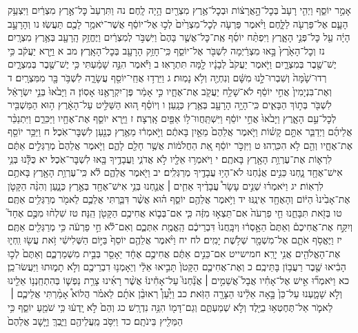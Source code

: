 \documentclass[twoside, openany, parskip=half, 11pt]{book}
\begin{document}
אָמַ֣ר יוֹסֵ֑ף וַיְהִ֤י רָעָב֙ בְּכׇל־הָ֣אֲרָצ֔וֹת וּבְכׇל־אֶ֥רֶץ מִצְרַ֖יִם הָ֥יָה לָֽחֶם׃ נה וַתִּרְעַב֙ כׇּל־אֶ֣רֶץ מִצְרַ֔יִם וַיִּצְעַ֥ק הָעָ֛ם אֶל־פַּרְעֹ֖ה לַלָּ֑חֶם וַיֹּ֨אמֶר פַּרְעֹ֤ה לְכׇל־מִצְרַ֙יִם֙ לְכ֣וּ אֶל־יוֹסֵ֔ף אֲשֶׁר־יֹאמַ֥ר לָכֶ֖ם תַּעֲשֽׂוּ׃ נו וְהָרָעָ֣ב הָיָ֔ה עַ֖ל כׇּל־פְּנֵ֣י הָאָ֑רֶץ וַיִּפְתַּ֨ח יוֹסֵ֜ף אֶֽת־כׇּל־אֲשֶׁ֤ר בָּהֶם֙ וַיִּשְׁבֹּ֣ר לְמִצְרַ֔יִם וַיֶּחֱזַ֥ק הָֽרָעָ֖ב בְּאֶ֥רֶץ מִצְרָֽיִם׃ נז וְכׇל־הָאָ֙רֶץ֙ בָּ֣אוּ מִצְרַ֔יְמָה לִשְׁבֹּ֖ר אֶל־יוֹסֵ֑ף כִּֽי־חָזַ֥ק הָרָעָ֖ב בְּכׇל־הָאָֽרֶץ׃ מב א וַיַּ֣רְא יַעֲקֹ֔ב כִּ֥י יֶשׁ־שֶׁ֖בֶר בְּמִצְרָ֑יִם וַיֹּ֤אמֶר יַעֲקֹב֙ לְבָנָ֔יו לָ֖מָּה תִּתְרָאֽוּ׃ ב וַיֹּ֕אמֶר הִנֵּ֣ה שָׁמַ֔עְתִּי כִּ֥י יֶשׁ־שֶׁ֖בֶר בְּמִצְרָ֑יִם רְדוּ־שָׁ֙מָּה֙ וְשִׁבְרוּ־לָ֣נוּ מִשָּׁ֔ם וְנִחְיֶ֖ה וְלֹ֥א נָמֽוּת׃ ג וַיֵּרְד֥וּ אֲחֵֽי־יוֹסֵ֖ף עֲשָׂרָ֑ה לִשְׁבֹּ֥ר בָּ֖ר מִמִּצְרָֽיִם׃ ד וְאֶת־בִּנְיָמִין֙ אֲחִ֣י יוֹסֵ֔ף לֹא־שָׁלַ֥ח יַעֲקֹ֖ב אֶת־אֶחָ֑יו כִּ֣י אָמַ֔ר פֶּן־יִקְרָאֶ֖נּוּ אָסֽוֹן׃ ה וַיָּבֹ֙אוּ֙ בְּנֵ֣י יִשְׂרָאֵ֔ל לִשְׁבֹּ֖ר בְּת֣וֹךְ הַבָּאִ֑ים כִּֽי־הָיָ֥ה הָרָעָ֖ב בְּאֶ֥רֶץ כְּנָֽעַן׃ ו וְיוֹסֵ֗ף ה֚וּא הַשַּׁלִּ֣יט עַל־הָאָ֔רֶץ ה֥וּא הַמַּשְׁבִּ֖יר לְכׇל־עַ֣ם הָאָ֑רֶץ וַיָּבֹ֙אוּ֙ אֲחֵ֣י יוֹסֵ֔ף וַיִּשְׁתַּֽחֲווּ־ל֥וֹ אַפַּ֖יִם אָֽרְצָה׃ ז וַיַּ֥רְא יוֹסֵ֛ף אֶת־אֶחָ֖יו וַיַּכִּרֵ֑ם וַיִּתְנַכֵּ֨ר אֲלֵיהֶ֜ם וַיְדַבֵּ֧ר אִתָּ֣ם קָשׁ֗וֹת וַיֹּ֤אמֶר אֲלֵהֶם֙ מֵאַ֣יִן בָּאתֶ֔ם וַיֹּ֣אמְר֔וּ מֵאֶ֥רֶץ כְּנַ֖עַן לִשְׁבׇּר־אֹֽכֶל׃ ח וַיַּכֵּ֥ר יוֹסֵ֖ף אֶת־אֶחָ֑יו וְהֵ֖ם לֹ֥א הִכִּרֻֽהוּ׃ ט וַיִּזְכֹּ֣ר יוֹסֵ֔ף אֵ֚ת הַחֲלֹמ֔וֹת אֲשֶׁ֥ר חָלַ֖ם לָהֶ֑ם וַיֹּ֤אמֶר אֲלֵהֶם֙ מְרַגְּלִ֣ים אַתֶּ֔ם לִרְא֛וֹת אֶת־עֶרְוַ֥ת הָאָ֖רֶץ בָּאתֶֽם׃ י וַיֹּאמְר֥וּ אֵלָ֖יו לֹ֣א אֲדֹנִ֑י וַעֲבָדֶ֥יךָ בָּ֖אוּ לִשְׁבׇּר־אֹֽכֶל׃ יא כֻּלָּ֕נוּ בְּנֵ֥י אִישׁ־אֶחָ֖ד נָ֑חְנוּ כֵּנִ֣ים אֲנַ֔חְנוּ לֹא־הָי֥וּ עֲבָדֶ֖יךָ מְרַגְּלִֽים׃ יב וַיֹּ֖אמֶר אֲלֵהֶ֑ם לֹ֕א כִּֽי־עֶרְוַ֥ת הָאָ֖רֶץ בָּאתֶ֥ם לִרְאֽוֹת׃ יג וַיֹּאמְר֗וּ שְׁנֵ֣ים עָשָׂר֩ עֲבָדֶ֨יךָ אַחִ֧ים ׀ אֲנַ֛חְנוּ בְּנֵ֥י אִישׁ־אֶחָ֖ד בְּאֶ֣רֶץ כְּנָ֑עַן וְהִנֵּ֨ה הַקָּטֹ֤ן אֶת־אָבִ֙ינוּ֙ הַיּ֔וֹם וְהָאֶחָ֖ד אֵינֶֽנּוּ׃ יד וַיֹּ֥אמֶר אֲלֵהֶ֖ם יוֹסֵ֑ף ה֗וּא אֲשֶׁ֨ר דִּבַּ֧רְתִּי אֲלֵכֶ֛ם לֵאמֹ֖ר מְרַגְּלִ֥ים אַתֶּֽם׃ טו בְּזֹ֖את תִּבָּחֵ֑נוּ חֵ֤י פַרְעֹה֙ אִם־תֵּצְא֣וּ מִזֶּ֔ה כִּ֧י אִם־בְּב֛וֹא אֲחִיכֶ֥ם הַקָּטֹ֖ן הֵֽנָּה׃ טז שִׁלְח֨וּ מִכֶּ֣ם אֶחָד֮ וְיִקַּ֣ח אֶת־אֲחִיכֶם֒ וְאַתֶּם֙ הֵאָ֣סְר֔וּ וְיִבָּֽחֲנוּ֙ דִּבְרֵיכֶ֔ם הַֽאֱמֶ֖ת אִתְּכֶ֑ם וְאִם־לֹ֕א חֵ֣י פַרְעֹ֔ה כִּ֥י מְרַגְּלִ֖ים אַתֶּֽם׃ יז וַיֶּאֱסֹ֥ף אֹתָ֛ם אֶל־מִשְׁמָ֖ר שְׁלֹ֥שֶׁת יָמִֽים׃ לח יח וַיֹּ֨אמֶר אֲלֵהֶ֤ם יוֹסֵף֙ בַּיּ֣וֹם הַשְּׁלִישִׁ֔י זֹ֥את עֲשׂ֖וּ וִֽחְי֑וּ אֶת־הָאֱלֹהִ֖ים אֲנִ֥י יָרֵֽא׃ חמישייט אִם־כֵּנִ֣ים אַתֶּ֔ם אֲחִיכֶ֣ם אֶחָ֔ד יֵאָסֵ֖ר בְּבֵ֣ית מִשְׁמַרְכֶ֑ם וְאַתֶּם֙ לְכ֣וּ הָבִ֔יאוּ שֶׁ֖בֶר רַעֲב֥וֹן בָּתֵּיכֶֽם׃ כ וְאֶת־אֲחִיכֶ֤ם הַקָּטֹן֙ תָּבִ֣יאוּ אֵלַ֔י וְיֵאָמְנ֥וּ דִבְרֵיכֶ֖ם וְלֹ֣א תָמ֑וּתוּ וַיַּעֲשׂוּ־כֵֽן׃ כא וַיֹּאמְר֞וּ אִ֣ישׁ אֶל־אָחִ֗יו אֲבָל֮ אֲשֵׁמִ֣ים ׀ אֲנַ֘חְנוּ֮ עַל־אָחִ֒ינוּ֒ אֲשֶׁ֨ר רָאִ֜ינוּ צָרַ֥ת נַפְשׁ֛וֹ בְּהִתְחַֽנְנ֥וֹ אֵלֵ֖ינוּ וְלֹ֣א שָׁמָ֑עְנוּ עַל־כֵּן֙ בָּ֣אָה אֵלֵ֔ינוּ הַצָּרָ֖ה הַזֹּֽאת׃ כב וַיַּ֩עַן֩ רְאוּבֵ֨ן אֹתָ֜ם לֵאמֹ֗ר הֲלוֹא֩ אָמַ֨רְתִּי אֲלֵיכֶ֧ם ׀ לֵאמֹ֛ר אַל־תֶּחֶטְא֥וּ בַיֶּ֖לֶד וְלֹ֣א שְׁמַעְתֶּ֑ם וְגַם־דָּמ֖וֹ הִנֵּ֥ה נִדְרָֽשׁ׃ כג וְהֵם֙ לֹ֣א יָֽדְע֔וּ כִּ֥י שֹׁמֵ֖עַ יוֹסֵ֑ף כִּ֥י הַמֵּלִ֖יץ בֵּינֹתָֽם׃ כד וַיִּסֹּ֥ב מֵֽעֲלֵיהֶ֖ם וַיֵּ֑בְךְּ וַיָּ֤שׇׁב אֲלֵהֶם֙ 
\end{document}
